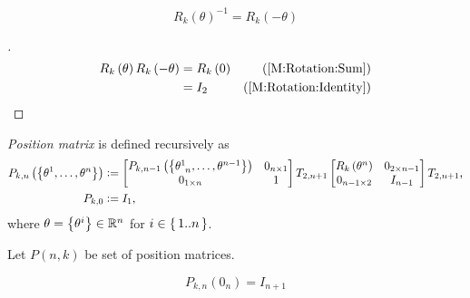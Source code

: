 \documentclass[stu, babel, american, biblatex, a4paper, leqno, draftall]{apa7}
\begin{document}
\begin{corollary}\label{M:Rotation:Inverse}
\begin{equation*}
	R_k\left(\theta\right)^{-1} = R_k\left(-\theta\right)
\end{equation*}
\end{corollary}
\begin{proof}[]
    \begin{align*}
        R_k\left(\theta\right)R_k\left(-\theta\right)
        &= R_k\left(0\right) & \text{(\cref{M:Rotation:Sum})} \\
        &= I_2 & \text{(\cref{M:Rotation:Identity})}
    \end{align*}
\end{proof}
\begin{definition}\label{M:Position}
    \textit{Position matrix} is defined recursively as
    \begin{align*}
        P_{k,n}\left(\left\{\tensor{\theta}{^1},\dots,\tensor{\theta}{^n}\right\}\right) & \defeq
        \begin{bmatrix}
            P_{k,n-1}\left(\left\{\tensor{\theta}{^1_{n}},\dots,\tensor{\theta}{^{n-1}}\right\}\right) & 0_{n\times 1} \\
            0_{1\times n}                                                                                      & 1 \\
        \end{bmatrix}
        T_{2,n+1}
        \begin{bmatrix}
            R_k\left(\tensor{\theta}{^n}\right) & 0_{{2}\times{n-1}} \\
            0_{{n-1}\times{2}}                                   & {I}_{n-1} \\
        \end{bmatrix}
        T_{2,n+1} \text{,}                                                                                        \\
        P_{k,0}                                                                          & \defeq I_1\text{,}
    \end{align*}
    where $\theta=\left\{\tensor{\theta}{^i}\right\}\in\R^n$ for $i\in\set{1..n}$.
\end{definition}
\begin{definition}\label{M:Position:Set}
    Let $P\left(n,k\right)$ be set of position matrices.
\end{definition}
\begin{corollary}\label{M:Position:Set:Identity}
    \begin{equation*}
    	P_{k,n}
    	\left(0_{n}\right)
    	=
    	I_{n+1}
    \end{equation*}
\end{corollary}
\end{document}

